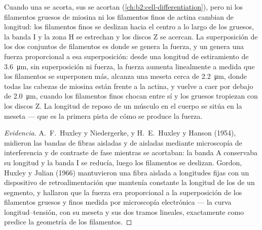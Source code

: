 \begin{proposition}\label{prop:b2:muscle-movement:sliding}
Cuando una  se acorta, sus  se acortan
(\cref{ch:b2:cell-differentiation}), pero ni los filamentos gruesos de
miosina ni los filamentos finos de actina cambian de longitud: los
filamentos finos se deslizan hacia el centro a lo largo de los gruesos, la
banda I y la zona H se estrechan y los discos Z se acercan. La
superposición de los dos conjuntos de filamentos es donde se genera la
fuerza, y un  genera una fuerza proporcional a esa
superposición: desde una longitud de estiramiento de
\qty{3.6}{\micro m}, sin superposición ni fuerza, la fuerza aumenta
linealmente a medida que los filamentos se superponen más, alcanza una
meseta cerca de \qty{2.2}{\micro m}, donde todas las cabezas de miosina
están frente a la actina, y vuelve a caer por debajo de
\qty{2.0}{\micro m}, cuando los filamentos finos chocan entre sí y los
gruesos tropiezan con los discos Z. La longitud de reposo de un músculo en
el cuerpo se sitúa en la meseta --- que es la primera pista de cómo se
produce la fuerza.
\end{proposition}
\begin{proof}[Evidencia]
A.~F.~Huxley y Niedergerke, y H.~E.~Huxley y Hanson (1954), midieron las
bandas de fibras aisladas y de  aisladas mediante microscopía
de interferencia y de contraste de fase mientras se acortaban: la banda A
conservaba su longitud y la banda I se reducía, luego los filamentos se
deslizan. Gordon, Huxley y Julian (1966) mantuvieron una fibra aislada a
longitudes fijas con un dispositivo de retroalimentación que mantenía
constante la longitud de los  de un segmento, y hallaron que la
fuerza era proporcional a la superposición de los filamentos gruesos y
finos medida por microscopía electrónica --- la curva longitud--tensión,
con su meseta y sus dos tramos lineales, exactamente como predice la
geometría de los filamentos.
\end{proof}
